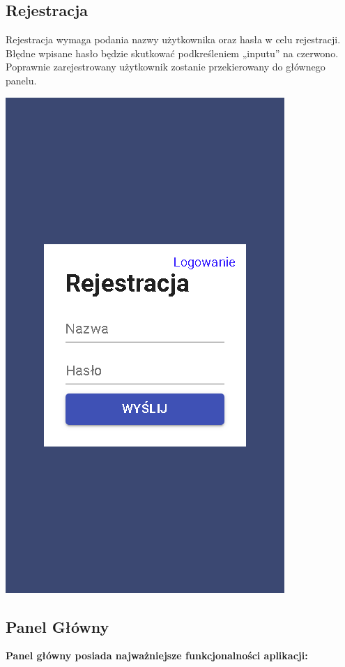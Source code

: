 \documentclass[12pt,a4paper]{article}  %
\begin{document}
		\subsection{Rejestracja}
		Rejestracja wymaga podania nazwy użytkownika oraz hasła w celu rejestracji.
		Błędne wpisane hasło będzie skutkować podkreśleniem „inputu” na czerwono. \\
		Poprawnie zarejestrowany użytkownik zostanie przekierowany do głównego panelu.
		\begin{center}
			\includegraphics[keepaspectratio,scale=0.65]{./img/register.PNG} \\[.8cm]
		\end{center}
		\newpage
		\subsection{Panel Główny}
		\textbf{Panel główny posiada najważniejsze funkcjonalności aplikacji:}
\end{document}
